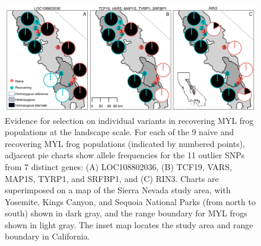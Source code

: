 \documentclass[9pt,twocolumn,twoside,lineno]{pnas-new}
\begin{document}
\clearpage
\begin{figure}

{\centering \includegraphics[width=\textwidth]{figures/allele_maps.png}

}

\caption{\label{fig-allelefrequencies}Evidence for selection on
individual variants in recovering MYL frog populations at the landscape
scale. For each of the 9 naive and recovering MYL frog populations
(indicated by numbered points), adjacent pie charts show allele
frequencies for the 11 outlier SNPs from 7 distinct genes: (A)
LOC108802036, (B) TCF19, VARS, MAP1S, TYRP1, and SRFBP1, and (C) RIN3.
Charts are superimposed on a map of the Sierra Nevada study area, with
Yosemite, Kings Canyon, and Sequoia National Parks (from north to south)
shown in dark gray, and the range boundary for MYL frogs shown in light
gray. The inset map locates the study area and range boundary in
California.}

\end{figure}

\newpage
\end{document}
